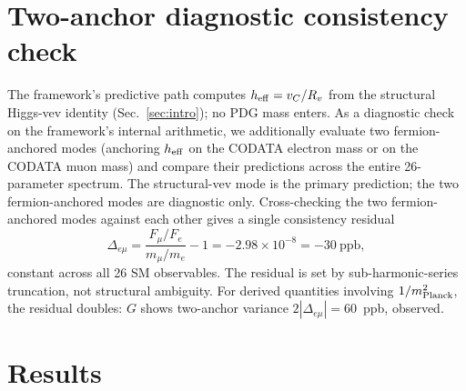 ﻿\documentclass[reprint,amsmath,amssymb,aps,prd,longbibliography,floatfix]{revtex4-2}
\begin{document}
\section{Two-anchor diagnostic consistency check}
\label{sec:anchor}

The framework's predictive path computes $h_{\rm eff} = v_C / R_v$
from the structural Higgs-vev identity (Sec.~\ref{sec:intro}); no PDG
mass enters. As a diagnostic check on the framework's internal
arithmetic, we additionally evaluate two fermion-anchored modes
(anchoring $h_{\rm eff}$ on the CODATA electron mass or on the CODATA
muon mass) and compare their predictions across the entire 26-parameter
spectrum. The structural-vev mode is the primary prediction; the two
fermion-anchored modes are diagnostic only. Cross-checking the two
fermion-anchored modes against each other gives a single consistency
residual
\begin{equation}
\Delta_{e\mu} = \frac{F_\mu/F_e}{m_\mu/m_e} - 1 = -2.98 \times 10^{-8} = -30~\text{ppb},
\end{equation}
constant across all 26 SM observables. The residual is set by
sub-harmonic-series truncation, not structural ambiguity. For derived
quantities involving $1/m_{\rm Planck}^2$, the residual doubles: $G$
shows two-anchor variance $2|\Delta_{e\mu}| = 60$~ppb, observed.

\section{Results}
\label{sec:results}
\end{document}
